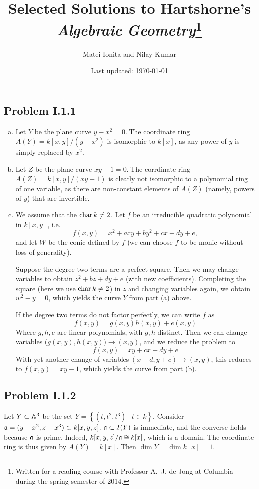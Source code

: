 \documentclass{mathnotes}
\title{Selected Solutions to Hartshorne's \textit{Algebraic Geometry}\footnote{Written for a reading course with Professor A.~J. de Jong at Columbia during the spring semester of 2014.}}
\author{Matei Ionita and Nilay Kumar}
\date{Last updated: \today}
\begin{document}
\maketitle

\subsection*{Problem I.1.1}
\begin{enumerate}[(a)]
    \item Let $Y$ be the plane curve $y-x^2=0$. The coordinate ring $A(Y)=k[x,y]/(y-x^2)$
        is isomorphic to $k[x]$, as any power of $y$ is simply replaced by $x^2$.
    \item Let $Z$ be the plane curve $xy-1=0$. The corrdinate ring $A(Z)=k[x,y]/(xy-1)$
        is clearly not isomorphic to a polynomial ring of one variable, as there are
        non-constant elements of $A(Z)$ (namely, powers of $y$) that are invertible.
    \item We assume that the $\operatorname{char} k\neq 2$.
        Let $f$ be an irreducible quadratic polynomial in $k[x,y]$, i.e.
        \[f(x,y)=x^2+axy+by^2+cx+dy+e,\]
        and let $W$ be the conic defined by $f$ (we can choose $f$ to be monic without
        loss of generality).
        
        Suppose the degree two terms are a perfect square.
        Then we may change variables to obtain $z^2+bz+dy+e$ (with new coefficients).
        Completing the square (here we use $\operatorname{char} k\neq 2$) in $z$ and changing
        variables again, we obtain $w^2-y=0$, which yields the curve $Y$ from part
        (a) above.

        If the degree two terms do not factor perfectly, we can write $f$ as
\[       f(x,y) = g(x,y) h(x,y) + e(x,y)     \]
Where $g,h,e$ are linear polynomials, with $g,h$ distinct. Then we can change variables $\big( g(x,y) , h(x,y) \big) \to (x,y)  $, and we reduce the problem to
\[       f(x,y) = xy + cx + dy +e      \]
With yet another change of variables $(x+d, y+c) \to (x,y)$, this reduces to $f(x,y) = xy - 1$, which yields the curve from part (b).
\end{enumerate}

\subsection*{Problem I.1.2}
Let $Y\subset \mathbb{A}^3$ be the set $Y=\left\{ (t,t^2,t^3)\mid t\in k\right\}$.
Consider $\mathfrak a=(y-x^2,z-x^3)\subset k[x,y,z]$. $\mathfrak a \subset I(Y)$ is immediate, and the converse holds because $\mathfrak a$ is prime. Indeed, $k[x,y,z]/\mathfrak a \cong k[x]$, which is a domain. The coordinate ring is thus given by $A(Y)=k[x]$. Then $\dim Y = \dim k[x] = 1$.
\end{document}
